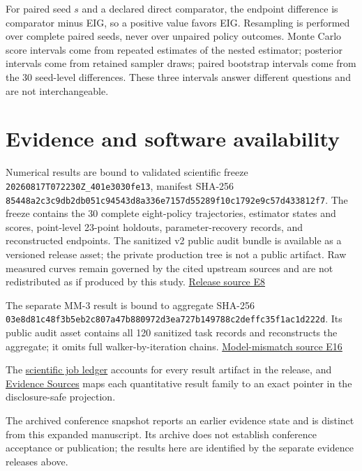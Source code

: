 For paired seed \(s\) and a declared direct comparator, the endpoint
difference is comparator minus EIG, so a positive value favors EIG.
Resampling is performed over complete paired seeds, never over unpaired
policy outcomes. Monte Carlo score intervals come from repeated
estimates of the nested estimator; posterior intervals come from
retained sampler draws; paired bootstrap intervals come from the 30
seed-level differences. These three intervals answer different questions
and are not interchangeable.

\hypertarget{evidence-and-software-availability}{%
\section{Evidence and software
availability}\label{evidence-and-software-availability}}

Numerical results are bound to validated scientific freeze
\texttt{20260817T072230Z\_401e3030fe13}, manifest SHA-256
\texttt{85448a2c\allowbreak{}3c9db2db\allowbreak{}051c9454\allowbreak{}3d8a336e\allowbreak{}7157d552\allowbreak{}89f10c17\allowbreak{}92e9c57d\allowbreak{}433812f7}.
The freeze contains the 30 complete eight-policy trajectories, estimator
states and scores, point-level 23-point holdouts, parameter-recovery
records, and reconstructed endpoints. The sanitized v2 public audit
bundle is available as a versioned release asset; the private production
tree is not a public artifact. Raw measured curves remain governed by
the cited upstream sources and are not redistributed as if produced by
this study.
\href{https://github.com/hoangduong6210/EIG-bayesian-for-Recover-potential-Physical-Parameter-of-MagComponent/blob/a3e6326621d90123e5661c17e2d562fb0f5e0a41/wiki/evidence/Evidence-Sources.md\#e8}{Release
source E8}

The separate MM-3 result is bound to aggregate SHA-256
\texttt{03e8d81c\allowbreak{}48f3b5eb\allowbreak{}2c807a47\allowbreak{}b880972d\allowbreak{}3ea727b1\allowbreak{}49788c2d\allowbreak{}effc35f1\allowbreak{}ac1d222d}.
Its public audit asset contains all 120 sanitized task records and
reconstructs the aggregate; it omits full walker-by-iteration chains.
\href{https://github.com/hoangduong6210/EIG-bayesian-for-Recover-potential-Physical-Parameter-of-MagComponent/blob/a3e6326621d90123e5661c17e2d562fb0f5e0a41/wiki/evidence/Evidence-Sources.md\#e16}{Model-mismatch
source E16}

The
\href{https://github.com/hoangduong6210/EIG-bayesian-for-Recover-potential-Physical-Parameter-of-MagComponent/blob/a3e6326621d90123e5661c17e2d562fb0f5e0a41/wiki/results/Scientific-Job-Results.md}{scientific
job ledger} accounts for every result artifact in the release, and
\href{https://github.com/hoangduong6210/EIG-bayesian-for-Recover-potential-Physical-Parameter-of-MagComponent/blob/a3e6326621d90123e5661c17e2d562fb0f5e0a41/wiki/evidence/Evidence-Sources.md}{Evidence
Sources} maps each quantitative result family to an exact pointer in the
disclosure-safe projection.

The archived conference snapshot reports an earlier evidence state and
is distinct from this expanded manuscript. Its archive does not
establish conference acceptance or publication; the results here are
identified by the separate evidence releases above.
